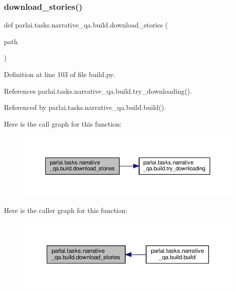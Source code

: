 \subsubsection{\texorpdfstring{download\+\_\+stories()}{download\_stories()}}
{\footnotesize\ttfamily def parlai.\+tasks.\+narrative\+\_\+qa.\+build.\+download\+\_\+stories (\begin{DoxyParamCaption}\item[{}]{path }\end{DoxyParamCaption})}



Definition at line 103 of file build.\+py.



References parlai.\+tasks.\+narrative\+\_\+qa.\+build.\+try\+\_\+downloading().



Referenced by parlai.\+tasks.\+narrative\+\_\+qa.\+build.\+build().

Here is the call graph for this function\+:
\nopagebreak
\begin{figure}[H]
\begin{center}
\leavevmode
\includegraphics[width=350pt]{namespaceparlai_1_1tasks_1_1narrative__qa_1_1build_afd6f28e1efb7e9f3328eef166f8be5cb_cgraph}
\end{center}
\end{figure}
Here is the caller graph for this function\+:
\nopagebreak
\begin{figure}[H]
\begin{center}
\leavevmode
\includegraphics[width=350pt]{namespaceparlai_1_1tasks_1_1narrative__qa_1_1build_afd6f28e1efb7e9f3328eef166f8be5cb_icgraph}
\end{center}
\end{figure}
\mbox{\label{namespaceparlai_1_1tasks_1_1narrative__qa_1_1build_a8d4e1f30e3de3f62c039296cbed12e8d}} 
